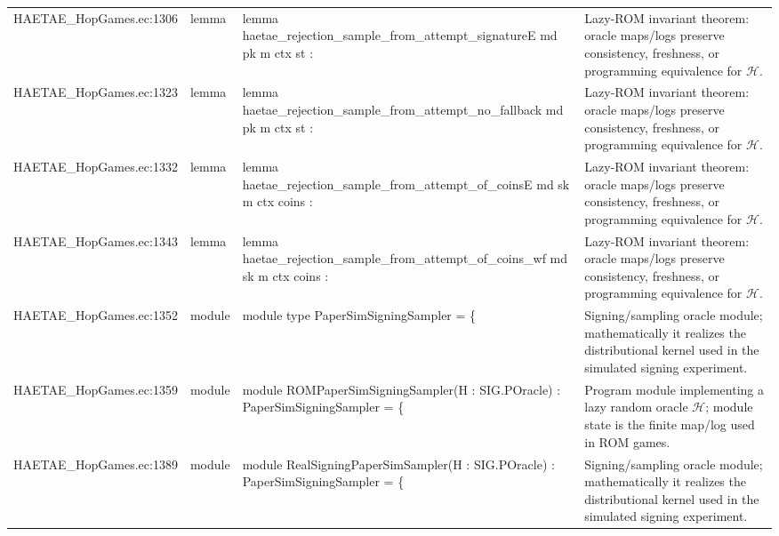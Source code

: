 \documentclass[10pt]{article}
\begin{document}
\begin{longtable}{L{0.11\textwidth}L{0.055\textwidth}L{0.385\textwidth}L{0.41\textwidth}}
HAETAE\_\allowbreak{}HopGames.\allowbreak{}ec:\allowbreak{}1306 & lemma & {\ttfamily\scriptsize lemma haetae\_\allowbreak{}rejection\_\allowbreak{}sample\_\allowbreak{}from\_\allowbreak{}attempt\_\allowbreak{}signatureE md pk m ctx st :} & Lazy-ROM invariant theorem: oracle maps/logs preserve consistency, freshness, or programming equivalence for $\mathcal H$. \\
HAETAE\_\allowbreak{}HopGames.\allowbreak{}ec:\allowbreak{}1323 & lemma & {\ttfamily\scriptsize lemma haetae\_\allowbreak{}rejection\_\allowbreak{}sample\_\allowbreak{}from\_\allowbreak{}attempt\_\allowbreak{}no\_\allowbreak{}fallback md pk m ctx st :} & Lazy-ROM invariant theorem: oracle maps/logs preserve consistency, freshness, or programming equivalence for $\mathcal H$. \\
HAETAE\_\allowbreak{}HopGames.\allowbreak{}ec:\allowbreak{}1332 & lemma & {\ttfamily\scriptsize lemma haetae\_\allowbreak{}rejection\_\allowbreak{}sample\_\allowbreak{}from\_\allowbreak{}attempt\_\allowbreak{}of\_\allowbreak{}coinsE md sk m ctx coins :} & Lazy-ROM invariant theorem: oracle maps/logs preserve consistency, freshness, or programming equivalence for $\mathcal H$. \\
HAETAE\_\allowbreak{}HopGames.\allowbreak{}ec:\allowbreak{}1343 & lemma & {\ttfamily\scriptsize lemma haetae\_\allowbreak{}rejection\_\allowbreak{}sample\_\allowbreak{}from\_\allowbreak{}attempt\_\allowbreak{}of\_\allowbreak{}coins\_\allowbreak{}wf md sk m ctx coins :} & Lazy-ROM invariant theorem: oracle maps/logs preserve consistency, freshness, or programming equivalence for $\mathcal H$. \\
HAETAE\_\allowbreak{}HopGames.\allowbreak{}ec:\allowbreak{}1352 & module & {\ttfamily\scriptsize module type PaperSimSigningSampler = \{} & Signing/sampling oracle module; mathematically it realizes the distributional kernel used in the simulated signing experiment. \\
HAETAE\_\allowbreak{}HopGames.\allowbreak{}ec:\allowbreak{}1359 & module & {\ttfamily\scriptsize module ROMPaperSimSigningSampler(H : SIG.POracle) : PaperSimSigningSampler = \{} & Program module implementing a lazy random oracle $\mathcal H$; module state is the finite map/log used in ROM games. \\
HAETAE\_\allowbreak{}HopGames.\allowbreak{}ec:\allowbreak{}1389 & module & {\ttfamily\scriptsize module RealSigningPaperSimSampler(H : SIG.POracle) : PaperSimSigningSampler = \{} & Signing/sampling oracle module; mathematically it realizes the distributional kernel used in the simulated signing experiment. \\

\end{longtable}
\end{document}
